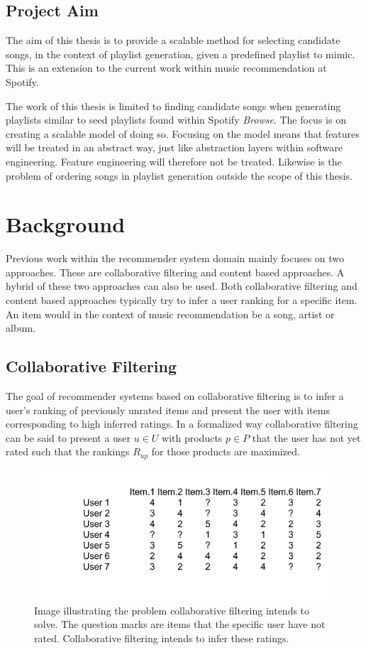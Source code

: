 \documentclass[a4paper,11pt]{kth-mag}
\begin{document}
\section{Project Aim}
The aim of this thesis is to provide a scalable method for selecting candidate songs, in the context of playlist generation, given a predefined playlist to mimic. This is an extension to the current work within music recommendation at Spotify.  

The work of this thesis is limited to finding candidate songs when generating playlists similar to seed playlists found within Spotify \textit{Browse}. The focus is on creating a scalable model of doing so. Focusing on the model means that features will be treated in an abstract way, just like abstraction layers within software engineering. Feature engineering will therefore not be treated. Likewise is the problem of ordering songs in playlist generation outside the scope of this thesis. 

\chapter{Background}

Previous work within the recommender system domain mainly focuses on two approaches. These are collaborative filtering and content based approaches. A hybrid of these two approaches can also be used. Both collaborative filtering and content based approaches typically try to infer a user ranking for a specific item\cite{melville2002content}. An item would in the context of music recommendation be a song, artist or album.

\section{Collaborative Filtering}
The goal of recommender systems based on collaborative filtering is to infer a user's ranking of previously unrated items and present the user with items corresponding to high inferred ratings. In a formalized way collaborative filtering can be said to present a user $u \in U$ with products $p \in P$ that the user has not yet rated such that the rankings $R_{up}$ for those products are maximized\cite{breese1998empirical}.

\begin{figure}
\includegraphics[scale=0.6]{images/colFiltMat.png}
\caption{Image illustrating the problem collaborative filtering intends to solve. The question marks are items that the specific user have not rated. Collaborative filtering intends to infer these ratings.}
\end{figure}
\end{document}
